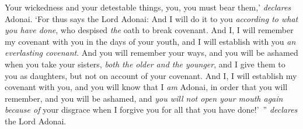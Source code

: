 \begin{biblechapter}
\verse Your wickedness and your detestable things, you, you must bear them,’ \textit{declares} Adonai.
\verse ‘For thus says the Lord Adonai: And I will do it to you \textit{according to what you have done}, who despised \textit{the} oath to break covenant.
\verse And I, I will remember my covenant with you in the days of your youth, and I will establish with you \textit{an everlasting covenant}.
\verse And you will remember your ways, and you will be ashamed when you take your sisters, \textit{both the older and the younger}, and I give them to you as daughters, but not on account of your covenant.
\verse And I, I will establish my covenant with you, and you will know that I \textit{am} Adonai,
\verse in order that you will remember, and you will be ashamed, and \textit{you will not open your mouth again} \textit{because of} your disgrace when I forgive you for all that you have done!’ ” \textit{declares} the Lord Adonai.
\end{biblechapter}

